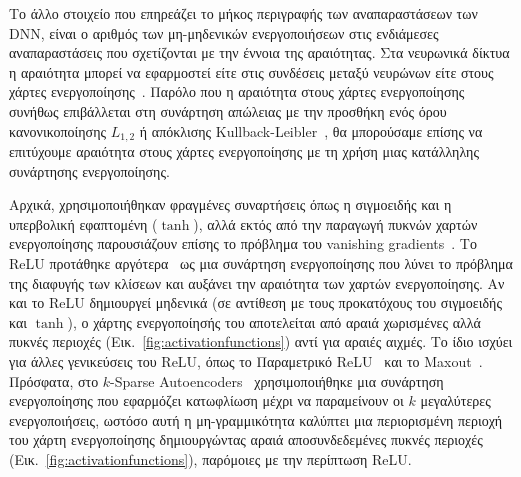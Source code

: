 Το άλλο στοιχείο που επηρεάζει το μήκος περιγραφής των αναπαραστάσεων των DNN, είναι ο αριθμός των μη-μηδενικών ενεργοποιήσεων στις ενδιάμεσες αναπαραστάσεις που σχετίζονται με την έννοια της αραιότητας.
Στα νευρωνικά δίκτυα η αραιότητα μπορεί να εφαρμοστεί είτε στις συνδέσεις μεταξύ νευρώνων είτε στους χάρτες ενεργοποίησης~\cite{laughlin2003communication}.
Παρόλο που η αραιότητα στους χάρτες ενεργοποίησης συνήθως επιβάλλεται στη συνάρτηση απώλειας με την προσθήκη ενός όρου κανονικοποίησης $L_{1, 2}$ ή απόκλισης Kullback-Leibler~\cite{kingma2013auto}, θα μπορούσαμε επίσης να επιτύχουμε αραιότητα στους χάρτες ενεργοποίησης με τη χρήση μιας κατάλληλης συνάρτησης ενεργοποίησης.

Αρχικά, χρησιμοποιήθηκαν φραγμένες συναρτήσεις όπως η σιγμοειδής και η υπερβολική εφαπτομένη ($\tanh$), αλλά εκτός από την παραγωγή πυκνών χαρτών ενεργοποίησης παρουσιάζουν επίσης το πρόβλημα του vanishing gradients~\cite{bengio1994learning}.
Το ReLU προτάθηκε αργότερα~\cite{glorot2011deep, nair2010rectified} ως μια συνάρτηση ενεργοποίησης που λύνει το πρόβλημα της διαφυγής των κλίσεων και αυξάνει την αραιότητα των χαρτών ενεργοποίησης.
Αν και το ReLU δημιουργεί μηδενικά (σε αντίθεση με τους προκατόχους του σιγμοειδής και $\tanh$), ο χάρτης ενεργοποίησής του αποτελείται από αραιά χωρισμένες αλλά πυκνές περιοχές (Εικ.~\ref{fig:activationfunctions}) αντί για αραιές αιχμές.
Το ίδιο ισχύει για άλλες γενικεύσεις του ReLU, όπως το Παραμετρικό ReLU~\cite{he2015delving} και το Maxout~\cite{goodfellow2013maxout}.
Πρόσφατα, στο $k$-Sparse Autoencoders~\cite{makhzani2013k} χρησιμοποιήθηκε μια συνάρτηση ενεργοποίησης που εφαρμόζει κατωφλίωση μέχρι να παραμείνουν οι $k$ μεγαλύτερες ενεργοποιήσεις, ωστόσο αυτή η μη-γραμμικότητα καλύπτει μια περιορισμένη περιοχή του χάρτη ενεργοποίησης δημιουργώντας αραιά αποσυνδεδεμένες πυκνές περιοχές (Εικ.~\ref{fig:activationfunctions}), παρόμοιες με την περίπτωση ReLU\@.

